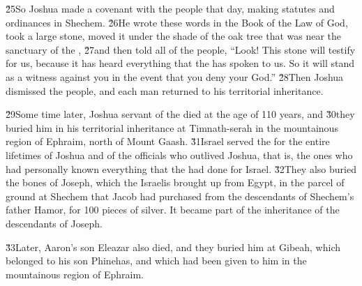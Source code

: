 \v{25}So Joshua made a covenant with the people that day, making statutes and ordinances in Shechem. \v{26}He wrote these words in the Book of the Law of God, took a large stone, moved it under the shade of the oak tree that was near the sanctuary of the , \v{27}and then told all of the people, ``Look! This stone will testify for us, because it has heard everything that the  has spoken to us. So it will stand as a witness against you in the event that you deny your God.'' \v{28}Then Joshua dismissed the people, and each man returned to his territorial inheritance.

\v{29}Some time later, Joshua servant of the  died at the age of 110 years, and \v{30}they buried him in his territorial inheritance at Timnath-serah in the mountainous region of Ephraim, north of Mount Gaash. \v{31}Israel served the  for the entire lifetimes of Joshua and of the officials who outlived Joshua, that is, the ones who had personally known everything that the  had done for Israel. \v{32}They also buried the bones of Joseph, which the Israelis brought up from Egypt, in the parcel of ground at Shechem that Jacob had purchased from the descendants of Shechem's father Hamor, for 100 pieces of silver. It became part of the inheritance of the descendants of Joseph.

\v{33}Later, Aaron's son Eleazar also died, and they buried him at Gibeah, which belonged to his son Phinehas, and which had been given to him in the mountainous region of Ephraim.
